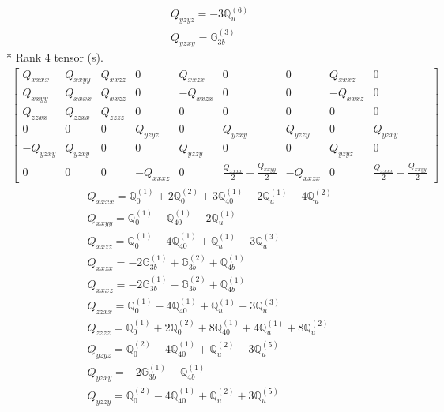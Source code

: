 \documentclass[fleqn,8pt,landscape]{jsarticle}
\begin{document}
\begin{align*}
& Q_{yzyz} = - 3 \mathbb{Q}_{u}^{(6)} \\
& Q_{yzxy} = \mathbb{G}_{3b}^{(3)}
\end{align*}
* Rank 4 tensor (s).
\begin{align*}
\begin{bmatrix} Q_{xxxx} & Q_{xxyy} & Q_{xxzz} & 0 & Q_{xxzx} & 0 & 0 & Q_{xxxz} & 0 \\ Q_{xxyy} & Q_{xxxx} & Q_{xxzz} & 0 & - Q_{xxzx} & 0 & 0 & - Q_{xxxz} & 0 \\ Q_{zzxx} & Q_{zzxx} & Q_{zzzz} & 0 & 0 & 0 & 0 & 0 & 0 \\ 0 & 0 & 0 & Q_{yzyz} & 0 & Q_{yzxy} & Q_{yzzy} & 0 & Q_{yzxy} \\ - Q_{yzxy} & Q_{yzxy} & 0 & 0 & Q_{yzzy} & 0 & 0 & Q_{yzyz} & 0 \\ 0 & 0 & 0 & - Q_{xxxz} & 0 & \frac{Q_{xxxx}}{2} - \frac{Q_{xxyy}}{2} & - Q_{xxzx} & 0 & \frac{Q_{xxxx}}{2} - \frac{Q_{xxyy}}{2} \end{bmatrix}
\end{align*}
\begin{align*}
& Q_{xxxx} = \mathbb{Q}_{0}^{(1)} + 2 \mathbb{Q}_{0}^{(2)} + 3 \mathbb{Q}_{40}^{(1)} - 2 \mathbb{Q}_{u}^{(1)} - 4 \mathbb{Q}_{u}^{(2)} \\
& Q_{xxyy} = \mathbb{Q}_{0}^{(1)} + \mathbb{Q}_{40}^{(1)} - 2 \mathbb{Q}_{u}^{(1)} \\
& Q_{xxzz} = \mathbb{Q}_{0}^{(1)} - 4 \mathbb{Q}_{40}^{(1)} + \mathbb{Q}_{u}^{(1)} + 3 \mathbb{Q}_{u}^{(3)} \\
& Q_{xxzx} = - 2 \mathbb{G}_{3b}^{(1)} + \mathbb{G}_{3b}^{(2)} + \mathbb{Q}_{4b}^{(1)} \\
& Q_{xxxz} = - 2 \mathbb{G}_{3b}^{(1)} - \mathbb{G}_{3b}^{(2)} + \mathbb{Q}_{4b}^{(1)} \\
& Q_{zzxx} = \mathbb{Q}_{0}^{(1)} - 4 \mathbb{Q}_{40}^{(1)} + \mathbb{Q}_{u}^{(1)} - 3 \mathbb{Q}_{u}^{(3)} \\
& Q_{zzzz} = \mathbb{Q}_{0}^{(1)} + 2 \mathbb{Q}_{0}^{(2)} + 8 \mathbb{Q}_{40}^{(1)} + 4 \mathbb{Q}_{u}^{(1)} + 8 \mathbb{Q}_{u}^{(2)} \\
& Q_{yzyz} = \mathbb{Q}_{0}^{(2)} - 4 \mathbb{Q}_{40}^{(1)} + \mathbb{Q}_{u}^{(2)} - 3 \mathbb{Q}_{u}^{(5)} \\
& Q_{yzxy} = - 2 \mathbb{G}_{3b}^{(1)} - \mathbb{Q}_{4b}^{(1)} \\
& Q_{yzzy} = \mathbb{Q}_{0}^{(2)} - 4 \mathbb{Q}_{40}^{(1)} + \mathbb{Q}_{u}^{(2)} + 3 \mathbb{Q}_{u}^{(5)}
\end{align*}
\end{document}
